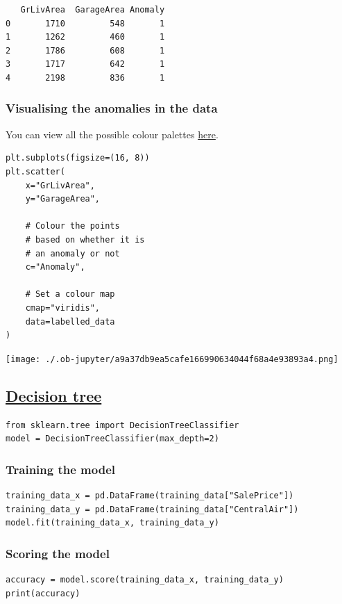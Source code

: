 \documentclass[11pt]{article}
\begin{document}
\label{orga1dbe51}
\begin{verbatim}
   GrLivArea  GarageArea Anomaly
0       1710         548       1
1       1262         460       1
2       1786         608       1
3       1717         642       1
4       2198         836       1
\end{verbatim}
\subsubsection{Visualising the anomalies in the data}
\label{sec:org559d0ad}
You can view all the possible colour palettes \href{https://seaborn.pydata.org/tutorial/color\_palettes.html\#qualitative-color-palettes}{here}.
\begin{verbatim}
plt.subplots(figsize=(16, 8))
plt.scatter(
    x="GrLivArea",
    y="GarageArea",

    # Colour the points
    # based on whether it is
    # an anomaly or not
    c="Anomaly",

    # Set a colour map
    cmap="viridis",
    data=labelled_data
)
\end{verbatim}

\begin{center}
\texttt{[image: ./.ob-jupyter/a9a37db9ea5cafe166990634044f68a4e93893a4.png]}
\label{org0e5b712}
\end{center}
\subsection{\href{https://scikit-learn.org/stable/modules/generated/sklearn.tree.DecisionTreeClassifier.html}{Decision tree}}
\label{sec:org59949b9}
\begin{verbatim}
from sklearn.tree import DecisionTreeClassifier
model = DecisionTreeClassifier(max_depth=2)
\end{verbatim}
\subsubsection{Training the model}
\label{sec:orgf8554c7}
\begin{verbatim}
training_data_x = pd.DataFrame(training_data["SalePrice"])
training_data_y = pd.DataFrame(training_data["CentralAir"])
model.fit(training_data_x, training_data_y)
\end{verbatim}
\subsubsection{Scoring the model}
\label{sec:org3479872}
\begin{verbatim}
accuracy = model.score(training_data_x, training_data_y)
print(accuracy)
\end{verbatim}
\end{document}
